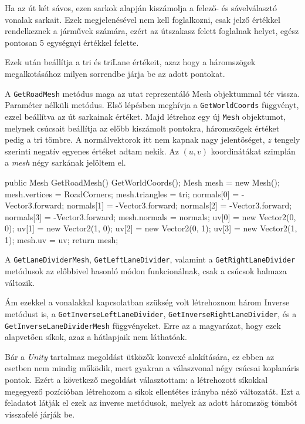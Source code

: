 Ha az út két sávos, ezen sarkok alapján kiszámolja a felező- és sávelválasztó vonalak sarkait. Ezek megjelenésével nem kell foglalkozni, csak jelző értékkel rendelkeznek a járművek számára, ezért az útszakasz felett foglalnak helyet, egész pontosan 5 egységnyi értékkel felette.

Ezek után beállítja a tri és triLane értékeit, azaz hogy a háromszögek megalkotásához milyen sorrendbe járja be az adott pontokat.


A \texttt{GetRoadMesh} metódus maga az utat reprezentáló Mesh objektummal tér vissza. Paraméter nélküli metódus. Első lépésben meghívja a \texttt{GetWorldCoords} függvényt, ezzel beállítva az út sarkainak értéket. Majd létrehoz egy új \texttt{Mesh} objektumot, melynek csúcsait beállítja az előbb kiszámolt pontokra, háromszögek értéket pedig a tri tömbre. A normálvektorok itt nem kapnak nagy jelentőséget, $z$ tengely szerinti negatív egyenes értéket adtam nekik. Az $(u, v)$ koordinátákat szimplán a \textit{mesh} négy sarkának jelöltem el.
\begin{cpp}
public Mesh GetRoadMesh()
        {
            GetWorldCoords();
            Mesh mesh = new Mesh();
            mesh.vertices = RoadCorners;
            mesh.triangles = tri;
            normals[0] = -Vector3.forward;
            normals[1] = -Vector3.forward;
            normals[2] = -Vector3.forward;
            normals[3] = -Vector3.forward;
            mesh.normals = normals;
            uv[0] = new Vector2(0, 0);
            uv[1] = new Vector2(1, 0);
            uv[2] = new Vector2(0, 1);
            uv[3] = new Vector2(1, 1);
            mesh.uv = uv;
            return mesh;
        }
\end{cpp}
A \texttt{GetLaneDividerMesh}, \texttt{GetLeftLaneDivider}, valamint a \texttt{GetRightLaneDivider} metódusok az előbbivel hasonló módon funkcionálnak, csak a csúcsok halmaza változik.

Ám ezekkel a vonalakkal kapcsolatban szükség volt létrehoznom három Inverse metódust is, a \texttt{GetInverseLeftLaneDivider}, \texttt{GetInverseRightLaneDivider}, és a \texttt{GetInverseLaneDividerMesh} függvényeket. Erre az a magyarázat, hogy ezek alapvetően síkok, azaz a hátlapjaik nem láthatóak. 

Bár a \textit{Unity} tartalmaz megoldást ütközők konvexé alakítására, ez ebben az esetben nem mindig működik, mert gyakran a válaszvonal négy csúcsai koplanáris pontok. Ezért a következő megoldást választottam: a létrehozott síkokkal megegyező pozícióban létrehozom a síkok ellentétes irányba néző változatát. Ezt a feladatot látják el ezek az inverse metódusok, melyek az adott háromszög tömböt visszafelé járják be.

